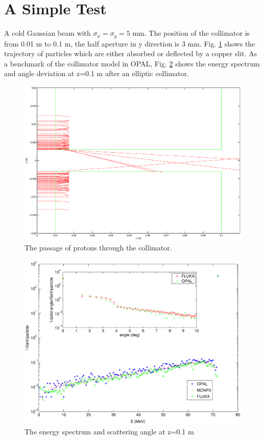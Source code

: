 \documentclass{article}
\begin{document}
\section{A Simple Test}
A cold Gaussian beam with $\sigma_x=\sigma_y=5$ mm.
The position of the  collimator is from 0.01 m to 0.1 m, the half aperture in y direction is $3$ mm.  Fig. \ref{fig:longcoll}
shows the trajectory of particles which are either absorbed or deflected by a copper slit. As a benchmark of the collimator model in OPAL, Fig. \ref{fig:Espectrum} shows the energy spectrum  and angle deviation at z=0.1 m after an elliptic collimator.
\begin{figure}[H]
\begin{center}
\includegraphics*[width=1.2\textwidth]{longcoll6}
\end{center}
\caption{The passage of protons through the collimator. }
\label{fig:longcoll}
\end{figure}

\begin{figure}[H]
\begin{center}
\includegraphics*[width=1.2\textwidth]{spectandscatter}
\end{center}
\caption{The energy spectrum and scattering angle at z=0.1 m}
\label{fig:Espectrum}
\end{figure}
\end{document}
